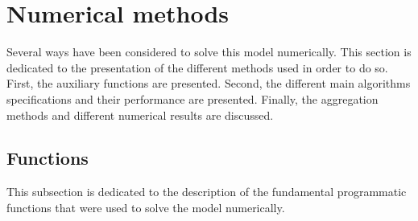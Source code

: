 \documentclass{article}
\begin{document}
\section{Numerical methods}

Several ways have been considered to solve this model numerically. 
This section is dedicated to the presentation of the different methods
used in order to do so. 
First, the auxiliary functions are presented. 
Second, the different main algorithms specifications and their performance are presented. 
Finally, the aggregation methods and different numerical results are discussed.

\subsection{Functions}

This subsection is dedicated to the description of the 
fundamental programmatic functions that were used to solve the model
numerically. 
\end{document}
